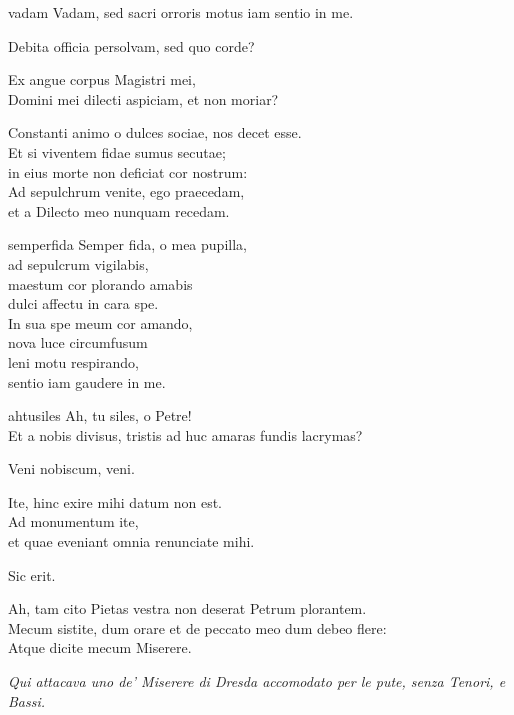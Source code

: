\documentclass[tocstyle=ref-genre]{ees}
\begin{document}
{\begin{movement}{vadam}
  Vadam, sed sacri orroris motus iam sentio in me.

  Debita officia persolvam, sed quo corde?

  Ex angue corpus Magistri mei,\\
  Domini mei dilecti aspiciam, et non moriar?

  \voice[M. Magdalena]
  Constanti animo o dulces sociae, nos decet esse.\\
  Et si viventem fidae sumus secutae;\\
  in eius morte non deficiat cor nostrum:\\
  Ad sepulchrum venite, ego praecedam,\\
  et a Dilecto meo nunquam recedam.
\end{movement}

\begin{movement}{semperfida}
  \voice[M. Magdalena]
  Semper fida, o mea pupilla,\\
  ad sepulcrum vigilabis,\\
  maestum cor plorando amabis\\
  dulci affectu in cara spe.\\
  In sua spe meum cor amando,\\
  nova luce circumfusum\\
  leni motu respirando,\\
  sentio iam gaudere in me.
\end{movement}

\begin{movement}{ahtusiles}
  Ah, tu siles, o Petre!\\
  Et a nobis divisus, tristis ad huc amaras fundis lacrymas?

  Veni nobiscum, veni.

  \voice[Petrus]
  Ite, hinc exire mihi datum non est.\\
  Ad monumentum ite,\\
  et quae eveniant omnia renunciate mihi.

  Sic erit.

  \voice[Petrus]
  Ah, tam cito Pietas vestra non deserat Petrum plorantem.\\
  Mecum sistite, dum orare et de peccato meo dum debeo flere:\\
  Atque dicite mecum Miserere.
\end{movement}

\textit{Qui attacava uno de’ Miserere di Dresda accomodato per le pute, senza Tenori, e Bassi.}
}

\eesScore
\end{document}
